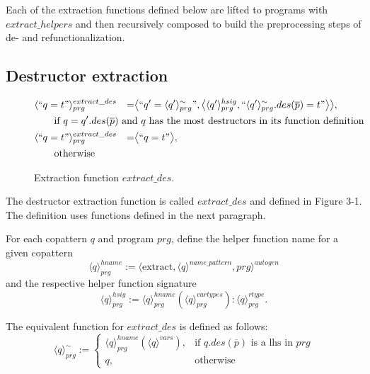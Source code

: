 Each of the extraction functions defined below are lifted to programs with $extract\_helpers$ and then recursively composed to build the preprocessing steps of de- and refunctionalization.

\subsection{Destructor extraction}

\begin{figure}
\vspace{2.4in}
\begin{alignat*}{3}
& \langle `` q = t " \rangle^{extract\_des}_{prg} &= &\big\langle `` q' =  \langle q' \rangle^{\sim}_{prg} ", \big\langle \langle q' \rangle^{hsig}_{prg}, `` \langle q' \rangle^{\sim}_{prg}.des(\overline{p}) = t  " \big\rangle \big\rangle, \span\span \\
& \qquad \textrm{if $q = q'.des(\overline{p})$ and $q$ has the most destructors in its function definition} \span\span\span \\
& \langle `` q = t " \rangle^{extract\_des}_{prg} &= &\big\langle `` q = t " \big\rangle, \span\span \\
& \qquad \textrm{otherwise} \span\span\span
\end{alignat*}
\caption{Extraction function $extract\_des$.}
\end{figure}

The destructor extraction function is called $extract\_des$ and defined in Figure 3-1. The definition uses functions defined in the next paragraph.

For each copattern $q$ and program $prg$, define the helper function name for a given copattern
\begin{equation*}
\langle q \rangle^{hname}_{prg} := \langle \textrm{extract}, \langle q \rangle^{name\_pattern}, prg \rangle^{autogen}
\end{equation*}
and the respective helper function signature
\begin{equation*}
\langle q \rangle^{hsig}_{prg} := \langle q \rangle^{hname}_{prg}(\langle q \rangle^{vartypes}_{prg}): \langle q \rangle^{rtype}_{prg}.
\end{equation*}

The equivalent function for $extract\_des$ is defined as follows:
\[
    \langle q \rangle^{\sim}_{prg} :=
\begin{cases}
    \langle q \rangle^{hname}_{prg}(\langle q \rangle^{vars}),& \text{if $q.des(\overline{p})$ is a lhs in $prg$} \\
    q,                                                                                      & \text{otherwise}
\end{cases}
\]

